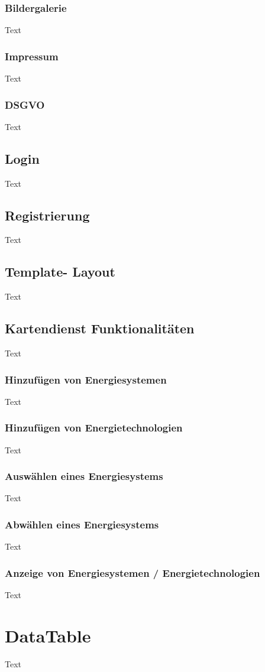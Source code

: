 \subsubsection{Bildergalerie}
Text
\subsubsection{Impressum}
Text
\subsubsection{DSGVO}
Text

\subsection{Login}
Text
\subsection{Registrierung}
Text
\subsection{Template- Layout}
Text
\subsection{Kartendienst Funktionalitäten}
Text
\subsubsection{Hinzufügen von Energiesystemen}
Text
\subsubsection{Hinzufügen von Energietechnologien}
Text
\subsubsection{Auswählen eines Energiesystems}
Text
\subsubsection{Abwählen eines Energiesystems}
Text
\subsubsection{Anzeige von Energiesystemen / Energietechnologien}
Text


\section{DataTable}
Text
